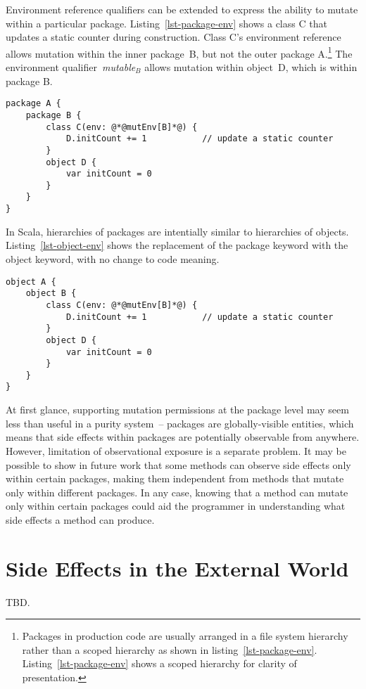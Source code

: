 Environment reference qualifiers can be extended to express the ability to mutate
within a particular package.
Listing~\ref{lst-package-env} shows a class {\cd C} that updates a static counter
during construction. Class {\cd C}'s environment reference allows mutation
within the inner package~{\cd B}, but not the outer package {\cd A}.\footnote{
	Packages in production code are usually arranged in a file system hierarchy
	rather than a scoped hierarchy as shown in listing~\ref{lst-package-env}.
	Listing~\ref{lst-package-env} shows a scoped hierarchy for clarity of presentation.
}
The environment qualifier~\mbox{{\em mutable}$_B$} allows mutation within
object~{\cd D}, which is within package {\cd B}.


\begin{lstlisting}[caption={Packages and Environment References},float={htp},label={lst-package-env}]
package A {
	package B {
		class C(env: @*@mutEnv[B]*@) {
			D.initCount += 1           // update a static counter
		}
		object D {
			var initCount = 0
		}
	}
}
\end{lstlisting}

In Scala, hierarchies of packages are intentially similar to hierarchies of objects.
Listing~\ref{lst-object-env} shows the replacement of the {\cd package}
keyword with the {\cd object} keyword, with no change to code meaning.

\begin{lstlisting}[caption={Objects and Environment References},float={htp},label={lst-object-env}]
object A {
	object B {
		class C(env: @*@mutEnv[B]*@) {
			D.initCount += 1           // update a static counter
		}
		object D {
			var initCount = 0
		}
	}
}
\end{lstlisting}

At first glance, supporting mutation permissions at the package level
may seem less than useful in a purity system~-- packages are globally-visible
entities, which means that side effects within packages are potentially
observable from anywhere.
However, limitation of observational exposure is a separate problem.
It may be possible to show in future work that some methods can
observe side effects only within certain packages, making them independent from
methods that mutate only within different packages.
In any case, knowing that a method can mutate only within certain packages
could aid the programmer in understanding what side effects a method can produce.

\section{Side Effects in the External World} \label{sec-external-world}

TBD.
